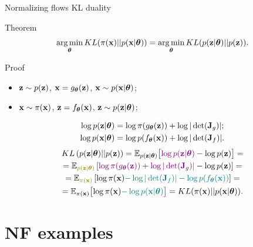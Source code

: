\begin{frame}{Normalizing flows KL duality}
	\begin{block}{Theorem}
		\vspace{-0.3cm}
		\[
			\operatorname*{arg\,min}_{\boldsymbol{\theta}} KL(\pi(\mathbf{x}) || p(\mathbf{x} | \boldsymbol{\theta})) = \operatorname*{arg\,min}_{\boldsymbol{\theta}} KL(p(\mathbf{z} | \boldsymbol{\theta}) || p(\mathbf{z})).
		\]
		\vspace{-0.5cm}
	\end{block}
	\begin{block}{Proof}
		\begin{itemize}
			\item $\mathbf{z} \sim p(\mathbf{z})$, $\mathbf{x} = g_{\boldsymbol{\theta}}(\mathbf{z})$, $\mathbf{x} \sim p(\mathbf{x}| \boldsymbol{\theta})$;
			\item $\mathbf{x} \sim \pi(\mathbf{x})$, $\mathbf{z} = f_{\boldsymbol{\theta}}(\mathbf{x})$, $\mathbf{z} \sim p(\mathbf{z} | \boldsymbol{\theta})$;
		\end{itemize}
		\vspace{-0.3cm}
		\begin{align*}
			\log p(\mathbf{z} | \boldsymbol{\theta}) &= \log \pi(g_{\boldsymbol{\theta}}(\mathbf{z})) + \log | \det ( \mathbf{J}_g) |; \\
			\log p(\mathbf{x} | \boldsymbol{\theta}) &= \log p(f_{\boldsymbol{\theta}}(\mathbf{x})) + \log | \det ( \mathbf{J}_f) |.
		\end{align*}
		\vspace{-0.9cm}
		\begin{multline*}
			KL\left(p(\bz | \btheta) || p(\bz) \right) = \mathbb{E}_{p(\bz | \btheta)} \bigl[ {\color{violet}\log p(\bz | \btheta)} - \log p(\bz) \bigr] = \\ 
			= \mathbb{E}_{{\color{olive}p(\bz | \btheta)}} \left[ {\color{violet}\log \pi(g_{\btheta}(\bz)) +  \log |\det (\bJ_g)|} - \log p(\bz) \right] = \\
			= \mathbb{E}_{{\color{olive}\pi(\bx)}} \left[ \log \pi(\bx) {\color{teal} - \log |\det (\bJ_f)| - \log p(f_{\btheta}(\bx))} \right] = \\
			= \mathbb{E}_{\pi(\bx)} \bigl[ \log \pi(\bx) {\color{teal} -\log p(\bx | \btheta)} \bigr] = KL (\pi(\bx) || p(\bx | \btheta)).
		\end{multline*}
	\end{block}
\end{frame}
\section{NF examples}
